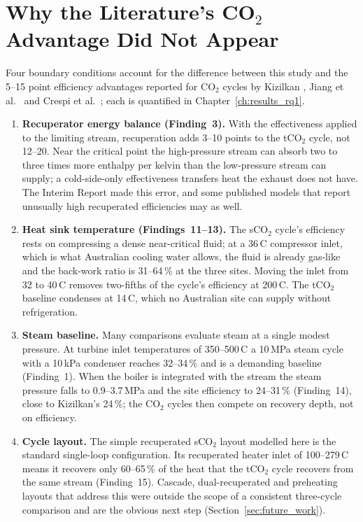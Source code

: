 \documentclass[12pt,a4paper]{report}
\begin{document}
\section{Why the Literature's CO$_2$ Advantage Did Not Appear}
\label{sec:discussion_paradox}

Four boundary conditions account for the difference between this study and
the 5--15 point efficiency advantages reported for CO$_2$ cycles by Kizilkan
\cite{Kizilkan2020}, Jiang et al.~\cite{Jiang2023} and Crespi et
al.~\cite{Crespi2017}; each is quantified in Chapter~\ref{ch:results_rq1}.

\begin{enumerate}[leftmargin=1.8em,itemsep=4pt]
\item \textbf{Recuperator energy balance (Finding~3).} With the effectiveness
applied to the limiting stream, recuperation adds 3--10 points to the
tCO$_2$ cycle, not 12--20. Near the critical point the high-pressure stream
can absorb two to three times more enthalpy per kelvin than the low-pressure
stream can supply; a cold-side-only effectiveness transfers heat the exhaust
does not have. The Interim Report made this error, and some published
models that report unusually high recuperated efficiencies may as well.
\item \textbf{Heat sink temperature (Findings~11--13).} The sCO$_2$ cycle's
efficiency rests on compressing a dense near-critical fluid; at a
36\,\textdegree C compressor inlet, which is what Australian cooling water
allows, the fluid is already gas-like and the back-work ratio is 31--64\,\%
at the three sites. Moving the inlet from 32 to 40\,\textdegree C removes
two-fifths of the cycle's efficiency at 200\,\textdegree C. The tCO$_2$
baseline condenses at 14\,\textdegree C, which no Australian site can
supply without refrigeration.
\item \textbf{Steam baseline.} Many comparisons evaluate steam at a single
modest pressure. At turbine inlet temperatures of 350--500\,\textdegree C a
10\,MPa steam cycle with a 10\,kPa condenser reaches 32--34\,\% and is a
demanding baseline (Finding~1). When the boiler is integrated with the
stream the steam pressure falls to 0.9--3.7\,MPa and the site efficiency to
24--31\,\% (Finding~14), close to Kizilkan's 24\,\%; the CO$_2$ cycles then
compete on recovery depth, not on efficiency.
\item \textbf{Cycle layout.} The simple recuperated sCO$_2$ layout
modelled here is the standard single-loop configuration. Its recuperated
heater inlet of 100--279\,\textdegree C means it recovers only 60--65\,\% of
the heat that the tCO$_2$ cycle recovers from the same stream (Finding~15). Cascade, dual-recuperated and preheating layouts
that address this were outside the scope of a consistent three-cycle
comparison and are the obvious next step (Section~\ref{sec:future_work}).
\end{enumerate}
\end{document}
